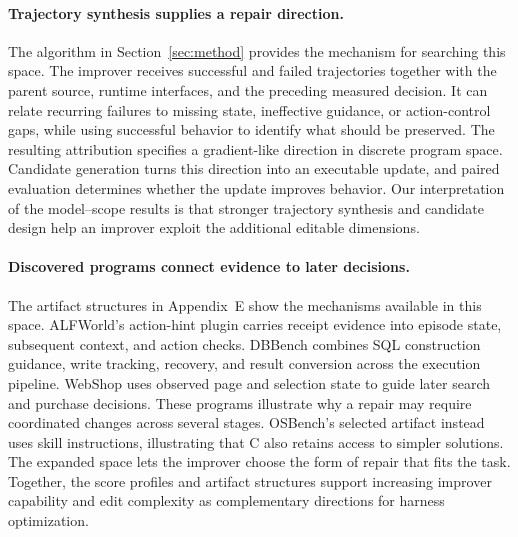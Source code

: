 \paragraph{Trajectory synthesis supplies a repair direction.}
The algorithm in Section~\ref{sec:method} provides the mechanism for searching this space. The improver receives successful and failed trajectories together with the parent source, runtime interfaces, and the preceding measured decision. It can relate recurring failures to missing state, ineffective guidance, or action-control gaps, while using successful behavior to identify what should be preserved. The resulting attribution specifies a gradient-like direction in discrete program space. Candidate generation turns this direction into an executable update, and paired evaluation determines whether the update improves behavior. Our interpretation of the model--scope results is that stronger trajectory synthesis and candidate design help an improver exploit the additional editable dimensions.

\paragraph{Discovered programs connect evidence to later decisions.}
The artifact structures in Appendix~E show the mechanisms available in this space. ALFWorld's action-hint plugin carries receipt evidence into episode state, subsequent context, and action checks. DBBench combines SQL construction guidance, write tracking, recovery, and result conversion across the execution pipeline. WebShop uses observed page and selection state to guide later search and purchase decisions. These programs illustrate why a repair may require coordinated changes across several stages. OSBench's selected artifact instead uses skill instructions, illustrating that C also retains access to simpler solutions. The expanded space lets the improver choose the form of repair that fits the task. Together, the score profiles and artifact structures support increasing improver capability and edit complexity as complementary directions for harness optimization.
